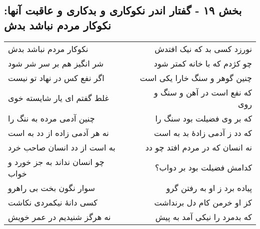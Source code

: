 \begin{center}
\section*{بخش ۱۹ - گفتار اندر نکوکاری و بدکاری و عاقبت آنها: نکوکار مردم نباشد بدش}
\label{sec:019}
\begin{longtable}{l p{0.5cm} r}
نکوکار مردم نباشد بدش
&&
نورزد کسی بد که نیک افتدش
\\
شر انگیز هم بر سر شر شود
&&
چو کژدم که با خانه کمتر شود
\\
اگر نفع کس در نهاد تو نیست
&&
چنین گوهر و سنگ خارا یکی است
\\
غلط گفتم ای یار شایسته خوی
&&
که نفع است در آهن و سنگ و روی
\\
چنین آدمی مرده به ننگ را
&&
که بر وی فضیلت بود سنگ را
\\
نه هر آدمی زاده از دد به است
&&
که دد ز آدمی زادهٔ بد به است
\\
به است از دد انسان صاحب خرد
&&
نه انسان که در مردم افتد چو دد
\\
چو انسان نداند به جز خورد و خواب
&&
کدامش فضیلت بود بر دواب؟
\\
سوار نگون بخت بی راهرو
&&
پیاده برد ز او به رفتن گرو
\\
کسی دانهٔ نیکمردی نکاشت
&&
کز او خرمن کام دل برنداشت
\\
نه هرگز شنیدیم در عمر خویش
&&
که بدمرد را نیکی آمد به پیش
\\
\end{longtable}
\end{center}
